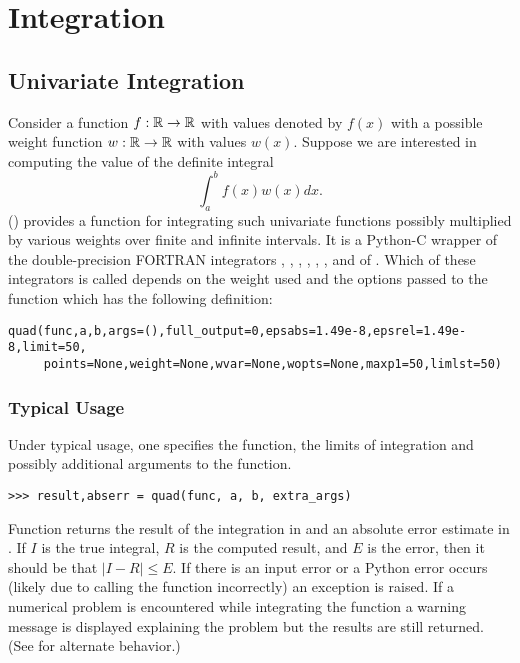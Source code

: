 
\section{Integration}
\label{sec:quadpack}

\subsection{Univariate Integration}
Consider a function $f:\mathbb{R} \rightarrow \mathbb{R}$ with values
denoted by $f(x)$ with a possible weight function $w:\mathbb{R} \rightarrow \mathbb{R}$
with values $w(x)$.  Suppose we are interested in computing the value
of the definite integral
\[
\int_a^b f(x) w(x) dx.
\]
 () provides a function
 for integrating such univariate functions possibly multiplied
by various weights over finite and infinite intervals.  It is a Python-C
wrapper of the double-precision FORTRAN integrators ,
, , , , , and
 of .  Which of these integrators is called
depends on the weight used and the options passed to the function
 which has the following definition:
\begin{verbatim}
quad(func,a,b,args=(),full_output=0,epsabs=1.49e-8,epsrel=1.49e-8,limit=50,
     points=None,weight=None,wvar=None,wopts=None,maxp1=50,limlst=50)
\end{verbatim}

\subsubsection{Typical Usage}
Under typical usage, one specifies the function, the limits of
integration and possibly additional arguments to the
function.
\begin{verbatim}
>>> result,abserr = quad(func, a, b, extra_args)
\end{verbatim}
Function  returns the result of the integration in
 and an absolute error estimate in .  If $I$
is the true integral, $R$ is the computed result, and $E$ is the
error, then it should be that $|I-R| \leq E$.  If there is an input
error or a Python error occurs (likely due to calling the function
incorrectly) an exception is raised.  If a numerical problem is
encountered while integrating the function a warning message is
displayed explaining the problem but the results are still
returned. (See  for alternate behavior.)

